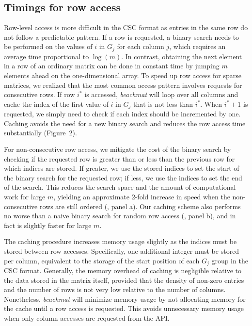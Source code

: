 \documentclass{article}
\newcommand{\beachmat}{\textit{beachmat}}
\begin{document}
\subsection{Timings for row access}
Row-level access is more difficult in the CSC format as entries in the same row do not follow a predictable pattern.
If a row is requested, a binary search needs to be performed on the values of $i$ in $G_j$ for each column $j$, which requires an average time proportional to $\log(m)$.
In contrast, obtaining the next element in a row of an ordinary matrix can be done in constant time by jumping $m$ elements ahead on the one-dimensional array.
To speed up row access for sparse matrices, we realized that the most common access pattern involves requests for consecutive rows.
If row $i^*$ is accessed, \beachmat{} will loop over all columns and cache the index of the first value of $i$ in $G_j$ that is not less than $i^*$.
When $i^*+1$ is requested, we simply need to check if each index should be incremented by one.
Caching avoids the need for a new binary search and reduces the row access time substantially (Figure~2).


For non-consecutive row access, we mitigate the cost of the binary search by checking if the requested row is greater than or less than the previous row for which indices are stored.
If greater, we use the stored indices to set the start of the binary search for the requested row; if less, we use the indices to set the end of the search. 
This reduces the search space and the amount of computational work for large $m$, yielding an approximate 2-fold increase in speed when the non-consecutive rows are still ordered (\suppfigsparserandom{}, panel a).
Our caching scheme also performs no worse than a naive binary search for random row access (\suppfigsparserandom{}, panel b), and in fact is slightly faster for large $m$.

The caching procedure increases memory usage slightly as the indices must be stored between row accesses.
Specifically, one additional integer must be stored per column, equivalent to the storage of the start position of each $G_j$ group in the CSC format.
Generally, the memory overhead of caching is negligible relative to the data stored in the matrix itself, provided that the density of non-zero entries and the number of rows is not very low relative to the number of columns.
Nonetheless, \beachmat{} will minimize memory usage by not allocating memory for the cache until a row access is requested.
This avoids unnecessary memory usage when only column accesses are requested from the API.
\end{document}
